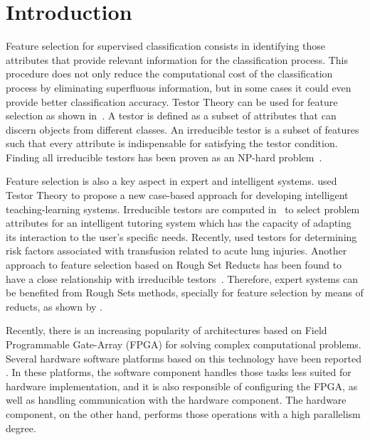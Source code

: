 \documentclass[authoryear,preprint,review,12pt]{elsarticle}
\begin{document}

\section{Introduction}
\label{sect:1}

Feature selection for supervised classification consists in identifying those attributes that 
provide relevant information for the classification process. This procedure does not only reduce the 
computational cost of the classification process by eliminating superfluous information, but in some cases 
it could even provide better classification accuracy. 
Testor Theory can be used for feature selection as shown in~\citep{R27,R5}. A testor is defined as a subset 
of attributes that can discern objects from different classes. An irreducible testor is a subset of features 
such that every attribute is indispensable for satisfying the testor condition. Finding all irreducible 
testors has been proven as an NP-hard problem~\citep{R40}.

Feature selection is also a key aspect in expert and intelligent systems. \cite{Mart07} used Testor Theory to
propose a new case-based approach for developing intelligent teaching-learning systems.  Irreducible testors
are computed in~\citep{Med07} to select problem attributes for an intelligent tutoring system 
which has the capacity of adapting its interaction to the user's specific needs. Recently, \cite{Torr14} used 
testors for determining risk factors associated with transfusion related to acute lung injuries. Another approach to 
feature selection based on Rough Set Reducts has been found to have a close relationship with irreducible 
testors~\citep{Lazo15}. Therefore, expert systems can be benefited from Rough Sets methods, specially for 
feature selection by means of reducts, as shown by \cite{Yah00}.

Recently, there is an increasing popularity of architectures based on Field Programmable Gate-Array (FPGA) 
for solving complex computational problems. Several hardware software platforms based on this technology have 
been reported \citep{R29,R30}. 
In these platforms, the software component handles those tasks less suited for hardware implementation, 
and it is also responsible of configuring the FPGA, as well as handling communication with the hardware component. 
The hardware component, on the other hand, performs those operations with a high parallelism degree.
\end{document}
